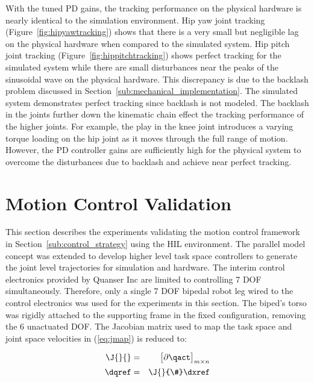 
With the tuned PD gains, the tracking performance on the physical hardware is nearly identical to the simulation environment. Hip yaw joint tracking (Figure~\ref{fig:hipyawtracking}) shows that there is a very small but negligible lag on the physical hardware when compared to the simulated system. Hip pitch joint tracking (Figure~\ref{fig:hippitchtracking}) shows perfect tracking for the simulated system while there are small disturbances near the peaks of the sinusoidal wave on the physical hardware. This discrepancy is due to the backlash problem discussed in Section~\ref{sub:mechanical_implementation}. The simulated system demonstrates perfect tracking since backlash is not modeled. The backlash in the joints further down the kinematic chain effect the tracking performance of the higher joints. For example, the play in the knee joint introduces a varying torque loading on the hip joint as it moves through the full range of motion. However, the PD controller gains are sufficiently high for the physical system to overcome the disturbances due to backlash and achieve near perfect tracking. 



\section{Motion Control Validation} %
\label{sec:motion_control_validation}
This section describes the experiments validating the motion control framework in Section~\ref{sub:control_strategy} using the HIL environment. The parallel model concept was extended to develop higher level task space controllers to generate the joint level trajectories for simulation and hardware. The interim control electronics provided by Quanser Inc are limited to controlling 7 DOF simultaneously. Therefore, only a single 7 DOF bipedal robot leg wired to the control electronics was used for the experiments in this section. The biped's torso was rigidly attached to the supporting frame in the fixed configuration, removing the 6 unactuated DOF. The Jacobian matrix used to map the task space and joint space velocities in (\ref{eq:jmap}) is reduced to: 

\begin{eqnarray}
	\J{}{} &=& \begin{bmatrix} \partial \qact \\ \end{bmatrix}_{m \times n} \\
	\dqref &=& \J{}{\#} \dxref \label{eq:calcqref}
\end{eqnarray}

